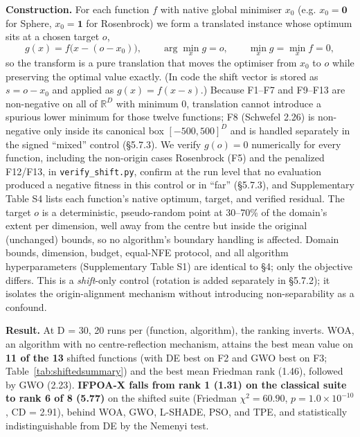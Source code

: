 \documentclass[preprint,12pt]{elsarticle}
\begin{document}
\textbf{Construction.} For each function $f$ with native global minimiser $x_0$ (e.g. $x_0=\mathbf{0}$ for Sphere, $x_0=\mathbf{1}$ for Rosenbrock) we form a translated instance whose optimum sits at a chosen target $o$,
\begin{equation}
g(x) = f\big(x - (o - x_0)\big), \qquad \arg\min_x g = o, \qquad \min_x g = \min_x f = 0,
\label{eq:shift}
\end{equation}
so the transform is a pure translation that moves the optimiser from $x_0$ to $o$ while preserving the optimal value exactly. (In code the shift vector is stored as $s = o - x_0$ and applied as $g(x)=f(x-s)$.) Because F1--F7 and F9--F13 are non-negative on all of $\mathbb{R}^D$ with minimum 0, translation cannot introduce a spurious lower minimum for those twelve functions; F8 (Schwefel 2.26) is non-negative only inside its canonical box $[-500,500]^D$ and is handled separately in the signed ``mixed'' control (\S5.7.3). We verify $g(o)=0$ numerically for every function, including the non-origin cases Rosenbrock (F5) and the penalized F12/F13, in \texttt{verify\_shift.py}, confirm at the run level that no evaluation produced a negative fitness in this control or in ``far'' (\S5.7.3), and Supplementary Table S4 lists each function's native optimum, target, and verified residual. The target $o$ is a deterministic, pseudo-random point at 30--70\% of the domain's extent per dimension, well away from the centre but inside the original (unchanged) bounds, so no algorithm's boundary handling is affected. Domain bounds, dimension, budget, equal-NFE protocol, and all algorithm hyperparameters (Supplementary Table S1) are identical to \S4; only the objective differs. This is a \emph{shift}-only control (rotation is added separately in \S5.7.2); it isolates the origin-alignment mechanism without introducing non-separability as a confound.

\textbf{Result.} At D = 30, 20 runs per (function, algorithm), the ranking inverts. WOA, an algorithm with no centre-reflection mechanism, attains the best mean value on \textbf{11 of the 13} shifted functions (with DE best on F2 and GWO best on F3; Table~\ref{tab:shiftedsummary}) and the best mean Friedman rank (1.46), followed by GWO (2.23). \textbf{IFPOA-X falls from rank 1 (1.31) on the classical suite to rank 6 of 8 (5.77)} on the shifted suite (Friedman $\chi^2 = 60.90$, $p = 1.0\times10^{-10}$, CD = 2.91), behind WOA, GWO, L-SHADE, PSO, and TPE, and statistically indistinguishable from DE by the Nemenyi test.
\end{document}
